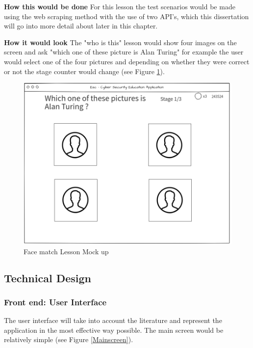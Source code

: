 \documentclass[12pt,a4paper]{article}
\begin{document}
\textbf{How this would be done}  
\newline For this lesson the test scenarios would be made using the web scraping method with the use of two API's, which this dissertation will go into more detail about later in this chapter.  

\textbf{How it would look}  
The "who is this" lesson would show four images on the screen and ask "which one of these picture is Alan Turing" for example the user would select one of the four pictures and depending on whether they were correct or not the stage counter would change (see Figure \ref{facemock}).
\begin{figure}[h]
    \centering
    \includegraphics[width=1.0\textwidth]{Figs/facemock.PNG} 
    \caption{Face match Lesson Mock up} 
    \label{facemock}
\end{figure}  


\subsection{Technical Design} 
\subsubsection{Front end: User Interface}  
The user interface will take into account the literature and represent the application in the most effective way possible. The main screen would be relatively simple (see Figure \ref{Mainscreen}).
\end{document}
